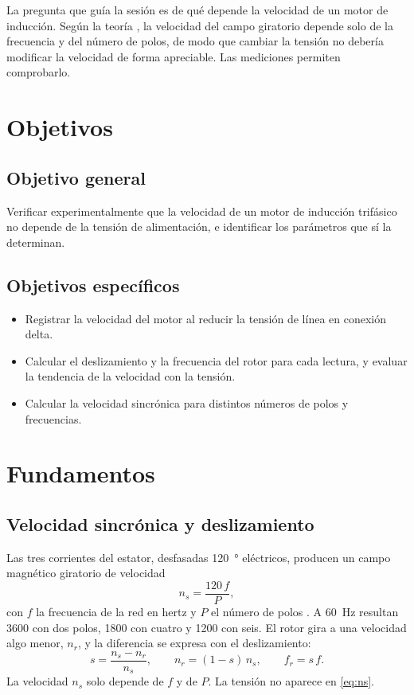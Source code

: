 \documentclass[conference]{IEEEtran}
\begin{document}
La pregunta que guía la sesión es de qué depende la velocidad de un motor de inducción. Según la teoría \cite{chapman,fraile}, la velocidad del campo giratorio depende solo de la frecuencia y del número de polos, de modo que cambiar la tensión no debería modificar la velocidad de forma apreciable. Las mediciones permiten comprobarlo.

\section{Objetivos}
\subsection{Objetivo general}
Verificar experimentalmente que la velocidad de un motor de inducción trifásico no depende de la tensión de alimentación, e identificar los parámetros que sí la determinan.

\subsection{Objetivos específicos}
\begin{itemize}
\item Registrar la velocidad del motor al reducir la tensión de línea en conexión delta.
\item Calcular el deslizamiento y la frecuencia del rotor para cada lectura, y evaluar la tendencia de la velocidad con la tensión.
\item Calcular la velocidad sincrónica para distintos números de polos y frecuencias.
\end{itemize}

\section{Fundamentos}
\subsection{Velocidad sincrónica y deslizamiento}
Las tres corrientes del estator, desfasadas \SI{120}{\degree} eléctricos, producen un campo magnético giratorio de velocidad
\begin{equation}
n_s=\frac{120\,f}{P},
\label{eq:ns}
\end{equation}
con $f$ la frecuencia de la red en hertz y $P$ el número de polos \cite{chapman}. A \SI{60}{Hz} resultan \SI{3600}{\rpm} con dos polos, \SI{1800}{\rpm} con cuatro y \SI{1200}{\rpm} con seis. El rotor gira a una velocidad algo menor, $n_r$, y la diferencia se expresa con el deslizamiento:
\begin{equation}
s=\frac{n_s-n_r}{n_s},\qquad n_r=(1-s)\,n_s,\qquad f_r=s\,f.
\label{eq:s}
\end{equation}
La velocidad $n_s$ solo depende de $f$ y de $P$. La tensión no aparece en \eqref{eq:ns}.
\end{document}
